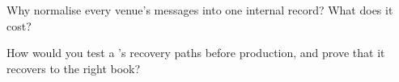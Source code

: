 \begin{interviewq}\label{iq:ll:the-feed-handler:5}
Why normalise every venue's messages into one internal record? What does it cost?
\end{interviewq}

\begin{interviewq}\label{iq:ll:the-feed-handler:6}
How would you test a 's recovery paths before production, and prove that it recovers to the right book?
\end{interviewq}

